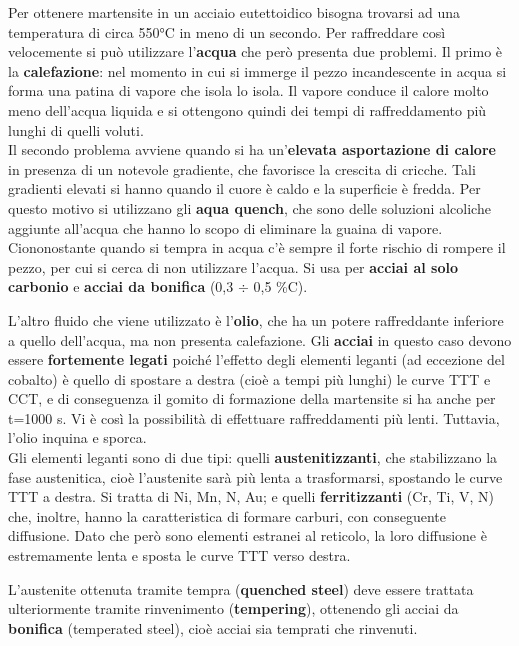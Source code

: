 Per ottenere martensite in un acciaio eutettoidico bisogna trovarsi ad una temperatura di circa 550°C in meno di un secondo. Per raffreddare così velocemente si può utilizzare l’\textbf{acqua} che però presenta due problemi. Il primo è la \textbf{calefazione}: nel momento in cui si immerge il pezzo incandescente in acqua si forma una patina di vapore che isola lo isola. Il vapore conduce il calore molto meno dell'acqua liquida e si ottengono quindi dei tempi di raffreddamento più lunghi di quelli voluti.\\
Il secondo problema avviene quando si ha un’\textbf{elevata asportazione di calore} in presenza di un notevole gradiente, che favorisce la crescita di cricche. Tali gradienti elevati si hanno quando il cuore è caldo e la superficie è fredda. Per questo motivo si utilizzano gli \textbf{aqua quench}, che sono delle soluzioni alcoliche aggiunte all’acqua che hanno lo scopo di eliminare la guaina di vapore. Ciononostante quando si tempra in acqua c’è sempre il forte rischio di rompere il pezzo, per cui si cerca di non utilizzare l’acqua. Si usa per \textbf{acciai al solo carbonio} e \textbf{acciai da bonifica} (0,3 $\div$ 0,5 \%C).

L’altro fluido che viene utilizzato è l’\textbf{olio}, che ha un potere raffreddante inferiore a quello dell’acqua, ma non presenta calefazione. Gli \textbf{acciai} in questo caso devono essere \textbf{fortemente legati} poiché l’effetto degli elementi leganti (ad eccezione del cobalto) è quello di spostare a destra (cioè a tempi più lunghi) le curve TTT e CCT, e di conseguenza il gomito di formazione della martensite si ha anche per t=1000 s. Vi è così la possibilità di effettuare raffreddamenti più lenti. Tuttavia, l’olio inquina e sporca.\\
Gli elementi leganti sono di due tipi: quelli \textbf{austenitizzanti}, che stabilizzano la fase austenitica, cioè l’austenite sarà più lenta a trasformarsi, spostando le curve TTT a destra. Si tratta di Ni, Mn, N, Au; e quelli \textbf{ferritizzanti} (Cr, Ti, V, N) che, inoltre, hanno la caratteristica di formare carburi, con conseguente diffusione. Dato che però sono elementi estranei al reticolo, la loro diffusione è estremamente lenta e sposta le curve TTT verso destra.

L’austenite ottenuta tramite tempra (\textbf{quenched steel}) deve essere trattata ulteriormente tramite rinvenimento (\textbf{tempering}), ottenendo gli acciai da \textbf{bonifica} (temperated steel), cioè acciai sia temprati che rinvenuti.

